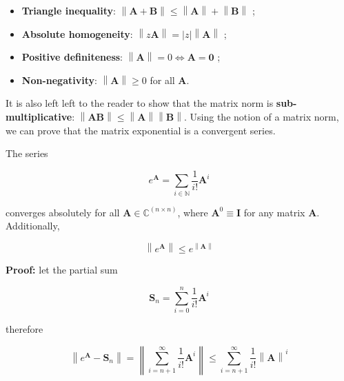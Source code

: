 \begin{itemize}
	\item \textbf{Triangle inequality}: $\left\lVert\mathbf{A} + \mathbf{B}\right\rVert \leq \left\lVert\mathbf{A}\right\rVert + \left\lVert\mathbf{B}\right\rVert$ ;
	\item \textbf{Absolute homogeneity}: $\left\lVert z\mathbf{A}\right\rVert = \left\lvert z\right\rvert \left\lVert\mathbf{A}\right\rVert$ ;
	\item \textbf{Positive definiteness}: $\left\lVert \mathbf{A}\right\rVert = 0 \Leftrightarrow \mathbf{A} = \mathbf{0}$ ;
	\item \textbf{Non-negativity}: $\left\lVert \mathbf{A}\right\rVert \geq 0$ for all $\mathbf{A}$.
\end{itemize}

	It is also left left to the reader to show that the matrix norm is \textbf{sub-multiplicative}: $\left\lVert \mathbf{A}\mathbf{B}\right\rVert \leq \left\lVert \mathbf{A} \right\rVert\left\lVert \mathbf{B}\right\rVert$. Using the notion of a matrix norm, we can prove that the matrix exponential is a convergent series.

\begin{theorem} \label{theo:matrix_exponential_powerconvergence}%
The series

\begin{equation} e^{\mathbf{A}} = \sum\limits_{i\in\mathbb{N}} \dfrac{1}{i!} \mathbf{A}^i \end{equation}

	converges absolutely for all $\mathbf{A}\in\mathbb{C}^{(n\times n)}$, where $\mathbf{A}^0 \equiv \mathbf{I}$ for any matrix $\mathbf{A}$. Additionally,

\begin{equation} \left\lVert e^{\mathbf{A}} \right\rVert \leq e^{\left\lVert \mathbf{A}\right\rVert}\end{equation}
\end{theorem}
\textbf{Proof:} let the partial sum

\begin{equation} \mathbf{S}_n = \sum\limits_{i=0}^n \dfrac{1}{i!} \mathbf{A}^i \end{equation}

	\noindent therefore

\begin{equation} \left\lVert e^{\mathbf{A}} - \mathbf{S}_n\right\rVert = \left\lVert \sum\limits_{i=n+1}^\infty \dfrac{1}{i!} \mathbf{A}^i\right\rVert \leq \sum\limits_{i=n+1}^\infty \dfrac{1}{i!} \left\lVert \mathbf{A} \right\rVert^i \end{equation}

